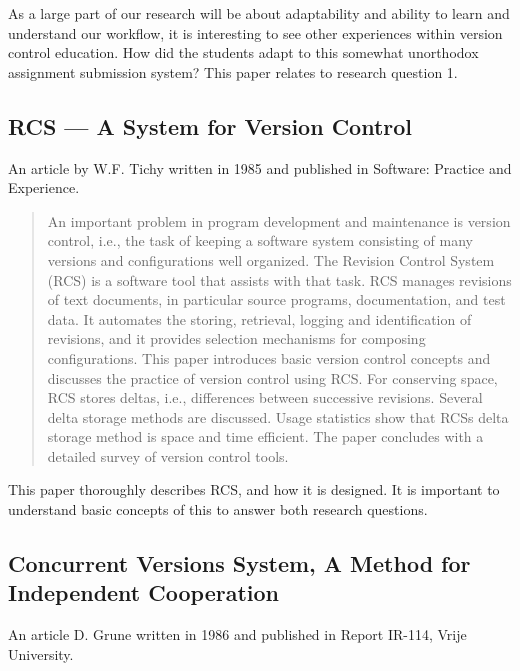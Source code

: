 \documentclass{llncs}
\begin{document}
As a large part of our research will be about adaptability and ability
to learn and understand our workflow, it is interesting to see other
experiences within version control education. How did the students
adapt to this somewhat unorthodox assignment submission system? This
paper relates to research question 1.

\subsection{RCS --- A System for Version Control}

An article by W.F. Tichy written in 1985 and published in Software:
Practice and Experience.

\begin{abstract}
 An important problem in program development and maintenance is
 version control, i.e., the task of keeping a software system
 consisting of many versions and configurations well organized. The
 Revision Control System (RCS) is a software tool that assists with
 that task. RCS manages revisions of text documents, in particular
 source programs, documentation, and test data. It automates the
 storing, retrieval, logging and identification of revisions, and
 it provides selection mechanisms for composing configurations. This
 paper introduces basic version control concepts and discusses the
 practice of version control using RCS. For conserving space, RCS
 stores deltas, i.e., differences between successive
 revisions. Several delta storage methods are discussed.  Usage
 statistics show that RCSs delta storage method is space and time
 efficient. The paper concludes with a detailed survey of version
 control tools.
\end{abstract}

This paper thoroughly describes RCS, and how it is designed. It is
important to understand basic concepts of this to answer both research
questions.

\subsection{Concurrent Versions System, A Method for Independent
  Cooperation}

An article D. Grune written in 1986 and published in Report IR-114,
Vrije University.
\end{document}
